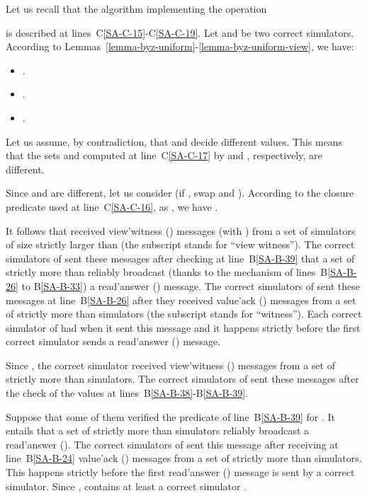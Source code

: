 \documentclass[11pt,letterpaper]{article}
\newlength {\afterproof}
\newenvironment{proofL}{\noindent{\bf Proof }}
{\hspace*{\fill}\par\vspace{\afterproof}}
\begin{document}
\begin{proofL}
Let us recall that the algorithm implementing the operation 

is described at lines~C\ref{SA-C-15}-C\ref{SA-C-19}.
Let  and  be two correct simulators.
According  to  Lemmas~\ref{lemma-byz-uniform}-\ref{lemma-byz-uniform-view},
we have:
\begin{itemize}
\vspace{-0.2cm}
\item .
\vspace{-0.2cm} 
\item .
\vspace{-0.2cm} 
\item .
\end{itemize}  
 
Let us assume, by contradiction, that  and 
decide different values. This means that the sets   and
  computed at line~C\ref{SA-C-17} by     and  ,
respectively,  are different.

Since  and  are different,
let us consider 
(if ,  swap  and ).
According to the closure predicate used at line~C\ref{SA-C-16},
as ,
we have  .

It  follows  that   received  {\sc view'witness}  ()
messages  (with )
from  a  set  of  simulators     of  size  strictly  larger  than
 (the subscript  stands for ``view witness'').
The correct simulators  of  sent these messages  after checking at
line~B\ref{SA-B-39} that
a set  of strictly more than  reliably broadcast
(thanks to the mechanism of lines~B\ref{SA-B-26} to B\ref{SA-B-33})
a {\sc read'answer} () message.
The   correct   simulators  of      sent   these  messages   at
line~B\ref{SA-B-26} after they  received  {\sc value'ack} () messages
from a set  of strictly more than  simulators
 (the subscript  stands for ``witness'').
Each  correct simulator   of   had   when it
sent this message and it happens
strictly  before the  first  correct simulator  sends  a {\sc  read'answer}
() message.

Since , the correct simulator  received
{\sc view'witness} () messages
from a set  of strictly more than  simulators.
The correct simulators of  sent these messages
after the check of the values at lines~B\ref{SA-B-38}-B\ref{SA-B-39}.

Suppose that some of them verified the predicate of line~B\ref{SA-B-39}
for .
It entails  that a set   of strictly more  than 
simulators reliably broadcast a {\sc read'answer} ().
The correct simulators of  sent this message after receiving at
line~B\ref{SA-B-24}  {\sc value'ack} () messages from a set 
of strictly more than  simulators.
This  happens  strictly before  the  first  {\sc read'answer}  ()
message is sent by a correct simulator.
Since       ,        contains
at least a correct simulator .



\end{proofL}
\end{document}
